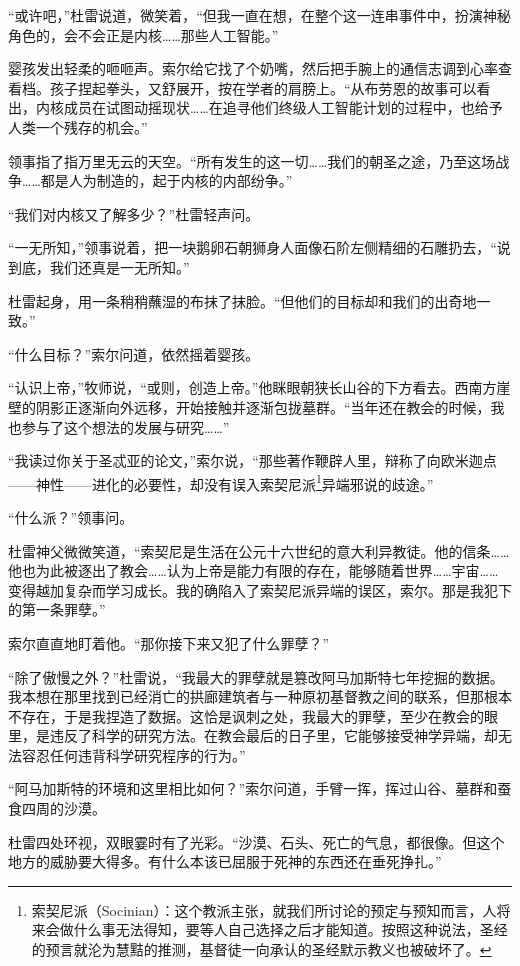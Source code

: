 \documentclass[AutoFakeBold=true]{book}
\begin{document}
``或许吧，''杜雷说道，微笑着，``但我一直在想，在整个这一连串事件中，扮演神秘角色的，会不会正是内核……那些人工智能。''

婴孩发出轻柔的咂咂声。索尔给它找了个奶嘴，然后把手腕上的通信志调到心率查看档。孩子捏起拳头，又舒展开，按在学者的肩膀上。``从布劳恩的故事可以看出，内核成员在试图动摇现状……在追寻他们终级人工智能计划的过程中，也给予人类一个残存的机会。''

领事指了指万里无云的天空。``所有发生的这一切……我们的朝圣之途，乃至这场战争……都是人为制造的，起于内核的内部纷争。''

``我们对内核又了解多少？''杜雷轻声问。

``一无所知，''领事说着，把一块鹅卵石朝狮身人面像石阶左侧精细的石雕扔去，``说到底，我们还真是一无所知。''

杜雷起身，用一条稍稍蘸湿的布抹了抹脸。``但他们的目标却和我们的出奇地一致。''

``什么目标？''索尔问道，依然摇着婴孩。

``认识上帝，''牧师说，``或则，创造上帝。''他眯眼朝狭长山谷的下方看去。西南方崖壁的阴影正逐渐向外远移，开始接触并逐渐包拢墓群。``当年还在教会的时候，我也参与了这个想法的发展与研究……''

``我读过你关于圣忒亚的论文，''索尔说，``那些著作鞭辟人里，辩称了向欧米迦点——神性——进化的必要性，却没有误入索契尼派\footnote{索契尼派（Socinian）：这个教派主张，就我们所讨论的预定与预知而言，人将来会做什么事无法得知，要等人自己选择之后才能知道。按照这种说法，圣经的预言就沦为慧黠的推测，基督徒一向承认的圣经默示教义也被破坏了。}异端邪说的歧途。''

``什么派？''领事问。

杜雷神父微微笑道，``索契尼是生活在公元十六世纪的意大利异教徒。他的信条……他也为此被逐出了教会……认为上帝是能力有限的存在，能够随着世界……宇宙……变得越加复杂而学习成长。我的确陷入了索契尼派异端的误区，索尔。那是我犯下的第一条罪孽。''

索尔直直地盯着他。``那你接下来又犯了什么罪孽？''

``除了傲慢之外？''杜雷说，``我最大的罪孽就是篡改阿马加斯特七年挖掘的数据。我本想在那里找到已经消亡的拱廊建筑者与一种原初基督教之间的联系，但那根本不存在，于是我捏造了数据。这恰是讽刺之处，我最大的罪孽，至少在教会的眼里，是违反了科学的研究方法。在教会最后的日子里，它能够接受神学异端，却无法容忍任何违背科学研究程序的行为。''

``阿马加斯特的环境和这里相比如何？''索尔问道，手臂一挥，挥过山谷、墓群和蚕食四周的沙漠。

杜雷四处环视，双眼霎时有了光彩。``沙漠、石头、死亡的气息，都很像。但这个地方的威胁要大得多。有什么本该已屈服于死神的东西还在垂死挣扎。''
\end{document}
